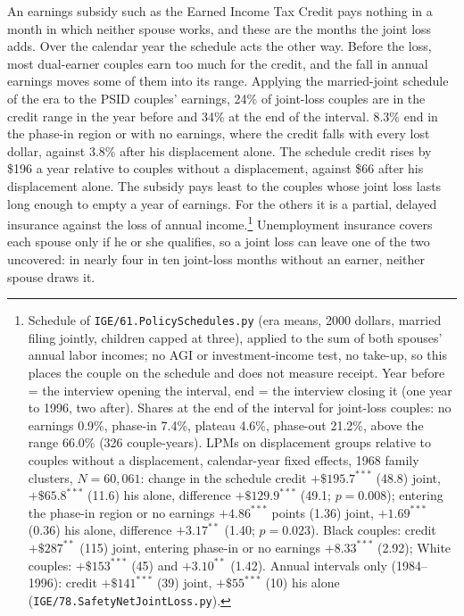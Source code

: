 An earnings subsidy such as the Earned Income Tax Credit pays nothing in a month in which neither spouse works, and
these are the months the joint loss adds. Over the calendar year the schedule acts the other way. Before the loss,
most dual-earner couples earn too much for the credit, and the fall in annual earnings moves some of them into its
range. Applying the married-joint schedule of the era to the PSID couples' earnings, 24\% of joint-loss couples are in
the credit range in the year before and 34\% at the end of the interval. 8.3\% end in the phase-in region or with no
earnings, where the credit falls with every lost dollar, against 3.8\% after his displacement alone. The schedule
credit rises by \$196 a year relative to couples without a displacement, against \$66 after his displacement alone.
The subsidy pays least to the couples whose joint loss lasts long enough to empty a year of earnings. For the others
it is a partial, delayed insurance against the loss of annual income.\footnote{Schedule of
\texttt{IGE/61.PolicySchedules.py} (era means, 2000 dollars, married filing jointly, children capped at three),
applied to the sum of both spouses' annual labor incomes; no AGI or investment-income test, no take-up, so this
places the couple on the schedule and does not measure receipt. Year before = the interview opening the interval,
end = the interview closing it (one year to 1996, two after). Shares at the end of the interval for joint-loss
couples: no earnings 0.9\%, phase-in 7.4\%, plateau 4.6\%, phase-out 21.2\%, above the range 66.0\% (326 couple-years).
LPMs on displacement groups relative to couples without a displacement, calendar-year fixed effects, 1968 family
clusters, $N = 60{,}061$: change in the schedule credit $+\$195.7^{***}$ (48.8) joint, $+\$65.8^{***}$ (11.6) his
alone, difference $+\$129.9^{***}$ (49.1; $p=0.008$); entering the phase-in region or no earnings $+4.86^{***}$
points (1.36) joint, $+1.69^{***}$ (0.36) his alone, difference $+3.17^{**}$ (1.40; $p=0.023$). Black couples: credit
$+\$287^{**}$ (115) joint, entering phase-in or no earnings $+8.33^{***}$ (2.92); White couples: $+\$153^{***}$ (45)
and $+3.10^{**}$ (1.42). Annual intervals only (1984--1996): credit $+\$141^{***}$ (39) joint, $+\$55^{***}$ (10) his
alone (\texttt{IGE/78.SafetyNetJointLoss.py}).} Unemployment insurance covers each spouse only if he or she
qualifies, so a joint loss can leave one of the two uncovered: in nearly four in ten joint-loss months without an earner,
neither spouse draws it.
